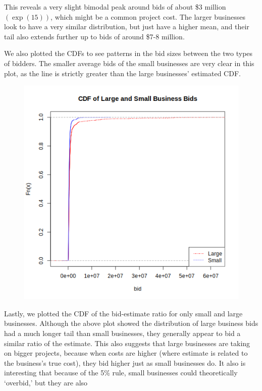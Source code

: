 This reveals a very slight bimodal peak around bids of about \$3 million
$(\exp(15))$, which might be a common project cost.
The larger businesses look to have a very similar distribution, but just have
a higher mean, and their tail also extends further up to bids of around \$7-8
million.

We also plotted the CDFs to see patterns in the bid sizes between
the two types of bidders. The smaller average bids of
the small businesses are very clear in this plot, as the line is strictly
greater than the large businesses' estimated CDF.
\begin{figure}[htb!]
    \centering
    \includegraphics[scale=0.6]{imgs/cdf.png}
\end{figure}
Lastly, we plotted the CDF of the bid-estimate ratio for only small and
large businesses. Although the above plot showed the distribution of large
business bids had a much longer tail than small businesses, they generally
appear to bid a similar ratio of the estimate. This also suggests that
large businesses are taking on bigger projects, because when costs are
higher (where estimate is related to the business's true cost), they
bid higher just as small businesses do. It also is interesting that because of the
5\% rule, small businesses could theoretically `overbid,' but they are also
